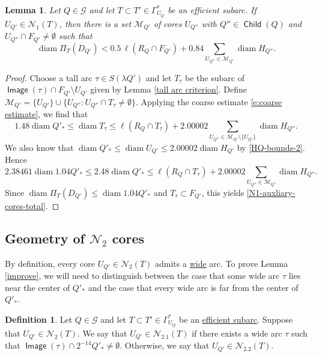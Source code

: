 \documentclass[12pt]{amsart}
\numberwithin{equation}{section}
\theoremstyle{plain}
\newtheorem{lemma}[theorem]{Lemma}
\theoremstyle{definition}
\newtheorem{definition}[theorem]{Definition}
\newcommand{\diam}{\mathop\mathrm{diam}\nolimits}
\newcommand{\Image}{\mathop\mathsf{Image}\nolimits}
\newcommand{\Child}{\mathop\mathsf{Child}\nolimits}
\numberwithin{figure}{section}
\begin{document}
\begin{lemma}\label{N1-auxiliary} Let $Q\in\mathscr{G}$ and let $T\subset T'\in\Gamma^*_{U_Q}$ be an efficient subarc. If $U_{Q'}\in\mathcal{N}_1(T)$, then there is a set $\mathcal{M}_{Q'}$ of cores $U_{Q''}$ with $Q''\in\Child(Q)$ and $U_{Q''}\cap F_{Q'}\neq\emptyset$ such that \begin{equation} \label{N1-auxliary-cores-total}
\diam \Pi_T(D_{Q'})< 0.5\,\ell(R_Q\cap F_{Q'}) + 0.84\sum_{U_{Q''}\in\mathcal{M}_{Q'}} \diam H_{Q''}.\end{equation}
\end{lemma}

\begin{proof} Choose a tall arc $\tau\in S(\lambda Q')$ and let $T_{\tau}$ be the subarc of $\Image(\tau)\cap F_{Q'}\setminus U_{Q'}$ given by Lemma \ref{tall arc criterion}. Define $\mathcal{M}_{Q'}=\{U_{Q'}\}\cup \{U_{Q''}: U_{Q''}\cap T_\tau\neq\emptyset\}$. Applying the coarse estimate \eqref{e:coarse estimate}, we find that \begin{equation*}
1.48\diam Q'_* \leq \diam T_{\tau} \leq \ell(R_Q\cap T_\tau) + 2.00002\sum_{U_{Q''}\in\mathcal{M}_{Q'}\setminus\{U_{Q'}\}}\diam H_{Q''}.\end{equation*} We also know that $\diam Q'_*\leq \diam U_{Q'}\leq 2.00002 \diam H_{Q'}$ by \eqref{HQ-bounds-2}. Hence \begin{equation*} 2.38461 \diam 1.04Q'_*\leq 2.48\diam Q'_* \leq \ell(R_Q\cap T_{\tau}) + 2.00002\sum_{U_{Q''}\in\mathcal{M}_{Q'}} \diam H_{Q''}.\end{equation*} Since $\diam \Pi_T(D_{Q'})\leq \diam 1.04Q'_*$ and $T_\tau\subset F_{Q'}$, this yields \eqref{N1-auxliary-cores-total}.
\end{proof}


\subsection{Geometry of $\mathcal{N}_2$ cores}\label{ss:N2} By definition, every core $U_{Q'}\in \mathcal{N}_2(T)$ admits a \hyperref[wide]{wide} arc. To prove Lemma \ref{improve}, we will need to distinguish between the case that some wide arc $\tau$ lies near the center of $Q'_*$ and the case that every wide arc is far from the center of $Q'_*$.

\begin{definition} Let $Q\in\mathscr{G}$ and let $T\subset T'\in\Gamma^*_{U_Q}$ be an \hyperref[def:subarc]{efficient subarc}. Suppose that $U_{Q'}\in\mathcal{N}_2(T)$. We say that $U_{Q'}\in\mathcal{N}_{2.1}(T)$ if there exists a wide arc $\tau$ such that $\Image(\tau)\cap 2^{-14}Q'_*\neq\emptyset$. Otherwise, we say that $U_{Q'}\in\mathcal{N}_{2.2}(T)$.\end{definition}
\end{document}
